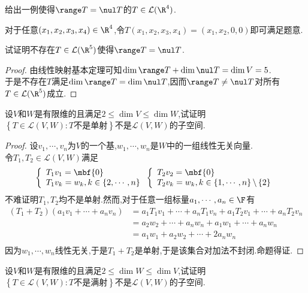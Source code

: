 \documentclass{ctexart}
\begin{document}
\begin{problem}[5.]
    给出一例使得$\range T=\nul T$的$T\in\mathcal{L}(\R^4)$.
\end{problem}
\begin{solution}[Solution.]
    对于任意$(x_1,x_2,x_3,x_4)\in\R^4$,令$T(x_1,x_2,x_3,x_4)=(x_1,x_2,0,0)$即可满足题意.
\end{solution}
\begin{problem}[6.]
    试证明不存在$T\in\mathcal{L}(\R^5)$使得$\range T=\nul T$.
\end{problem}
\begin{proof}
    由线性映射基本定理可知$\dim\range T+\dim\nul T=\dim V=5$.\\
    于是不存在$T$满足$\dim\range T=\dim\nul T$,因而$\range T\neq\nul T$对所有$T\in\mathcal{L}(\R^5)$成立.
\end{proof}
\begin{problem}[7.]
    设$V$和$W$是有限维的且满足$2\leqslant\dim V\leqslant\dim W$,试证明$\left\{T\in\mathcal{L}(V,W):T\text{不是单射}\right\}$不是$\mathcal{L}(V,W)$的子空间.
\end{problem}
\begin{proof}
    设$v_1,\cdots,v_n$为$V$的一个基,$w_1,\cdots,w_n$是$W$中的一组线性无关向量.\\
    令$T_1,T_2\in\mathcal{L}(V,W)$满足
    $$\left\{\begin{array}{l}
        T_1v_1=\mbf{0}\\
        T_1v_k=w_k,k\in\left\{2,\cdots,n\right\}
    \end{array}\right.
    \left\{\begin{array}{l}
        T_2v_2=\mbf{0}\\
        T_2v_k=w_k,k\in\left\{1,\cdots,n\right\}\backslash\left\{2\right\}
    \end{array}\right.$$
    不难证明$T_1,T_2$均不是单射.然而,对于任意一组标量$a_1,\cdots,a_n\in\F$有
    $$\begin{aligned}
        \left(T_1+T_2\right)\left(a_1v_1+\cdots+a_nv_n\right)
        &= a_1T_1v_1+\cdots+a_nT_1v_n+a_1T_2v_1+\cdots+a_nT_2v_n \\
        &= a_2w_2+\cdots+a_nw_n+a_1w_1+\cdots+a_nw_n \\
        &= a_1w_1+a_2w_2+\cdots+2a_nw_n \\
    \end{aligned}$$
    因为$w_1,\cdots,w_n$线性无关,于是$T_1+T_2$是单射,于是该集合对加法不封闭.命题得证.
\end{proof}
\begin{problem}[8.]
    设$V$和$W$是有限维的且满足$2\leqslant\dim W\leqslant\dim V$,试证明$\left\{T\in\mathcal{L}(V,W):T\text{不是满射}\right\}$不是$\mathcal{L}(V,W)$的子空间.
\end{problem}
\end{document}
